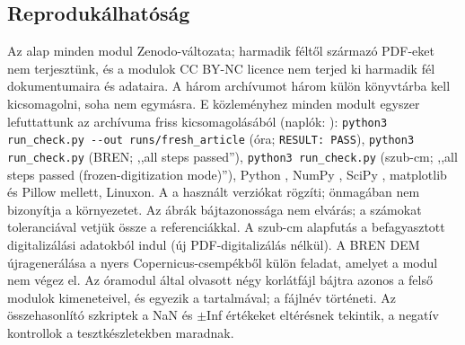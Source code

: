 \documentclass[11pt,a4paper]{article}
\begin{document}
\subsection{Reprodukálhatóság}
Az alap minden modul Zenodo-változata; harmadik féltől származó PDF-eket nem terjesztünk, és a modulok CC BY-NC licence nem
terjed ki harmadik fél dokumentumaira és adataira. A három archívumot három külön könyvtárba kell kicsomagolni, soha nem
egymásra. E közleményhez minden modult egyszer lefuttattunk az archívuma friss kicsomagolásából (naplók: ):
\texttt{python3 run\_check.py -{}-out runs/fresh\_article} (óra; \texttt{RESULT: PASS}),
\texttt{python3 run\_check.py} (BREN; ,,all steps passed''), \texttt{python3 run\_check.py} (szub-cm; ,,all steps passed
(frozen-digitization mode)''), Python , NumPy , SciPy , matplotlib  és Pillow
 mellett, Linuxon. A  a használt verziókat rögzíti; önmagában nem bizonyítja a környezetet.
Az ábrák bájtazonossága nem elvárás; a számokat toleranciával vetjük össze a referenciákkal.
A szub-cm alapfutás a befagyasztott digitalizálási adatokból indul (új PDF-digitalizálás nélkül). A BREN DEM újragenerálása a
nyers Copernicus-csempékből külön feladat, amelyet a modul nem végez el. Az óramodul által olvasott négy korlátfájl bájtra
azonos a felső modulok kimeneteivel, és egyezik a  tartalmával; a
 fájlnév történeti. Az összehasonlító szkriptek a NaN és $\pm$Inf értékeket
eltérésnek tekintik, a negatív kontrollok a tesztkészletekben maradnak.
\end{document}
